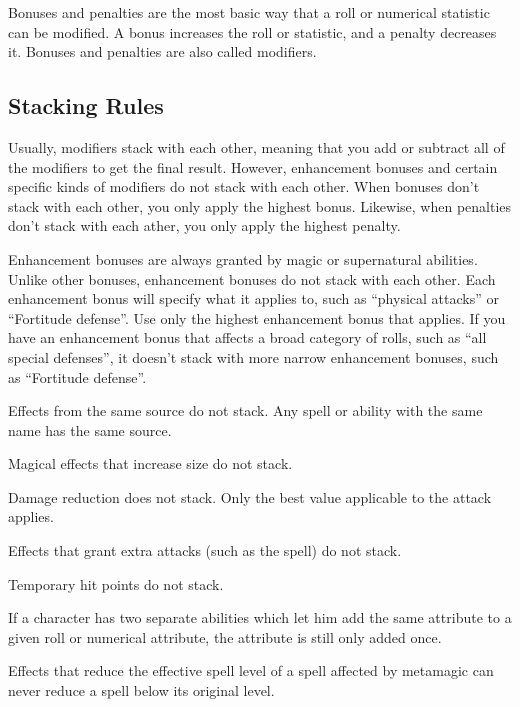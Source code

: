 Bonuses and penalties are the most basic way that a roll or numerical statistic can be modified. A bonus increases the roll or statistic, and a penalty decreases it. Bonuses and penalties are also called modifiers.

\subsection{Stacking Rules}\label{Stacking Rules}
Usually, modifiers stack with each other, meaning that you add or subtract all of the modifiers to get the final result. However, enhancement bonuses and certain specific kinds of modifiers do not stack with each other. When bonuses don't stack with each other, you only apply the highest bonus. Likewise, when penalties don't stack with each ather, you only apply the highest penalty.

 Enhancement bonuses are always granted by magic or supernatural abilities. Unlike other bonuses, enhancement bonuses do not stack with each other. Each enhancement bonus will specify what it applies to, such as ``physical attacks'' or ``Fortitude defense''. Use only the highest enhancement bonus that applies. If you have an enhancement bonus that affects a broad category of rolls, such as ``all special defenses'', it doesn't stack with more narrow enhancement bonuses, such as ``Fortitude defense''.


\begin{itemize*}
    \item Effects from the same source do not stack. Any spell or ability with the same name has the same source. 
    \item Magical effects that increase size do not stack.
    \item Damage reduction does not stack. Only the best value applicable to the attack applies.
    \item Effects that grant extra attacks (such as the  spell) do not stack.
    \item Temporary hit points do not stack.
    \item If a character has two separate abilities which let him add the same attribute to a given roll or numerical attribute, the attribute is still only added once.
    \item Effects that reduce the effective spell level of a spell affected by metamagic can never reduce a spell below its original level.
\end{itemize*}

